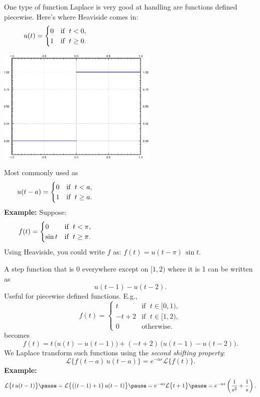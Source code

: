 \documentclass[10pt,aspectratio=169]{beamer}
\begin{document}
\begin{frame}
One type of function Laplace is very good at handling are functions defined
piecewise.  Here's where Heaviside comes in:
\[
u(t) =
\begin{cases}
0 & \text{if } \; t < 0 , \\ 
1 & \text{if } \; t \geq 0 .
\end{cases}
\hspace*{3in}
\]
\vspace*{-0.69in}

\hfill
\includegraphics[width=3.0in]{../figures/lt-heaviside}

\pause
\vspace*{-1.50in}

Most commonly used as
\[
u(t-a) =
\begin{cases}
0 & \text{if } \; t < a , \\ 
1 & \text{if } \; t \geq a .
\end{cases}
\hspace*{3in}
\]
\pause
\textbf{Example:}
Suppose:
\begin{equation*}
f(t) =
\begin{cases}
0 & \text{if } \; t < \pi , \\ 
\sin t & \text{if } \; t \geq \pi .
\end{cases}
\hspace*{3in}
\end{equation*}
\pause
Using Heaviside,
you could write $f$ as: \quad $f(t) = u(t - \pi) \, \sin t$.
\end{frame}

\begin{frame}
A step function that is $0$ everywhere except on $[1,2)$ where it is 1
can be written as
\[
u(t - 1) - u(t-2) .
\]
\pause
Useful for piecewise defined functions.  E.g.,
\[
f(t) =
\begin{cases}
t & \text{if } \; t \in [0,1) , \\ 
-t+2 & \text{if } \; t \in [1,2), \\
0 & \text{otherwise} .
\end{cases}
\]
becomes
\[
f(t) = t \, \bigl( u(t) - u(t-1) \bigr) + 
(-t+2) \, \bigl( u(t - 1) - u(t-2) \bigr) .
\]
\pause
We Laplace transform such functions using the \emph{second shifting property}:
\[
\mathcal{L} \bigl\{ f(t-a) \, u(t-a) \bigr\}
= e^{-as} \mathcal{L} \bigl\{ f(t) \bigr\} .
\]
\pause
\textbf{Example:}
\[
\mathcal{L} \bigl\{ t \, u(t-1) \bigr\}
\pause
=
\mathcal{L} \bigl\{ \bigl( (t-1) + 1\bigr) \, u(t-1) \bigr\}
\pause
= e^{-as} \mathcal{L} \bigl\{ t+1 \bigr\}
\pause
= e^{-as} \left(\frac{1}{s^2} + \frac{1}{s} \right)
.
\]
\end{frame}
\end{document}

